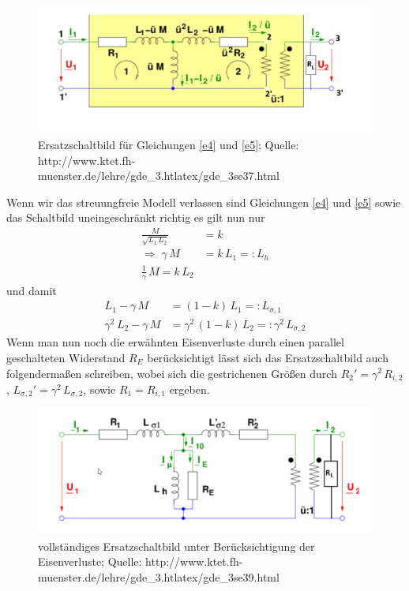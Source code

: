 \documentclass[a4paper, 12pt,]{scrartcl}
\begin{document}
\begin{figure}[H]\centering\includegraphics[scale=0.7]{ESB1'}\caption{Ersatzschaltbild für Gleichungen \ref{e4} und \ref{e5}; Quelle: http://www.ktet.fh-muenster.de/lehre/gde\_3.htlatex/gde\_3se37.html}\end{figure}
Wenn wir das streuungfreie Modell verlassen sind Gleichungen \ref{e4} und \ref{e5} sowie das Schaltbild uneingeschränkt richtig es gilt nun nur
\begin{align*}\frac{M}{\sqrt{L_1\,L_2}}&=k\\
\Rightarrow\; \gamma\,M&=k\,L_1=:L_h\\
\frac{1}{\gamma}\,M=k\,L_2\end{align*}
und damit
\begin{align*}
L_1-\gamma\,M&=(1-k)\,L_1=:L_{\sigma,1}\\
\gamma^2\,L_2-\gamma\,M&=\gamma^2\,(1-k)\,L_2=:\gamma^2\,L_{\sigma,2}\end{align*}
Wenn man nun noch die erwähnten Eisenverluste durch einen parallel geschalteten Widerstand $R_{E}$ berücksichtigt lässt sich das Ersatzschaltbild auch folgendermaßen schreiben, wobei sich die gestrichenen Größen durch $R_2'=\gamma^2\,R_{i,2}$, $L_{\sigma,2}'=\gamma^2\,L_{\sigma,2}$, sowie $R_1=R_{i,1}$ ergeben.
\begin{figure}[H]\centering\includegraphics[scale=0.6]{ESB2'}\caption{vollständiges Ersatzschaltbild unter Berücksichtigung der Eisenverluste; \newline
Quelle: http://www.ktet.fh-muenster.de/lehre/gde\_3.htlatex/gde\_3se39.html}\end{figure}
\end{document}
